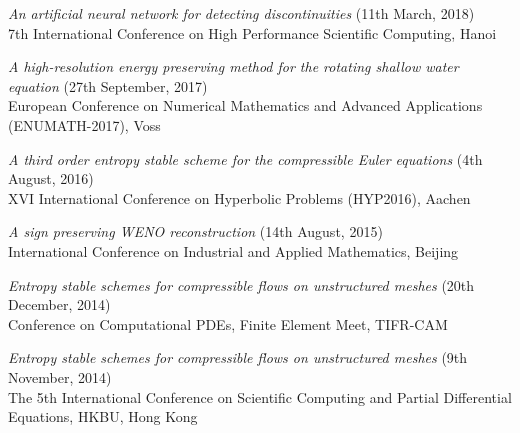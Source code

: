 \documentclass[margin]{res}
\begin{document}
\begin{resume}
              {\it An artificial neural network for detecting discontinuities} (11th March, 2018)\\
              7th International Conference on High Performance Scientific Computing, Hanoi 
              
              {\it A high-resolution energy preserving method for the rotating shallow water equation} (27th September, 2017)\\
               European Conference on Numerical Mathematics and Advanced Applications (ENUMATH-2017), Voss
              
              {\it A third order entropy stable scheme for the compressible Euler equations} (4th August, 2016)\\
               XVI International Conference on Hyperbolic Problems (HYP2016), Aachen 
              
              
              {\it A sign preserving WENO reconstruction} (14th August, 2015)\\
              International Conference on Industrial and Applied Mathematics, Beijing
              
              
              {\it Entropy stable schemes for compressible flows on unstructured meshes} (20th December, 2014)\\
               Conference on Computational PDEs, Finite Element Meet, TIFR-CAM  
              
              {\it Entropy stable schemes for compressible flows on unstructured meshes} (9th November, 2014)\\
               The 5th International Conference on Scientific Computing and Partial Differential Equations, HKBU, Hong Kong              
             
%              


\end{resume}
\end{document}
